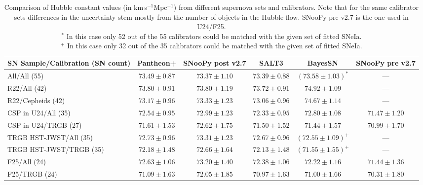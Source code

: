 \begin{table}[h]
\begin{center}
\centering
\begin{tabular}{l c c c c c}
\hline
SN Sample/Calibration  (SN count) & Pantheon+ & SNooPy post v2.7 & SALT3 & BayesSN & SNooPy pre v2.7 \\
\hline
All/All (55) & $73.49 \pm 0.87$ & $73.37 \pm 1.10$ & $73.39 \pm 0.88$ & $(73.58 \pm 1.03)^{*}$ & --- \\
R22/All (42) & $73.80 \pm 0.91$ & $73.80 \pm 1.19$ & $73.72 \pm 0.91$ & $74.92 \pm 1.09$ & --- \\
R22/Cepheids (42) & $73.17 \pm 0.96$ & $73.33 \pm 1.23$ & $73.06 \pm 0.96$ & $74.67 \pm 1.14$ & --- \\
CSP in U24/All (35) & $72.54 \pm 0.95$ & $72.99 \pm 1.23$ & $72.33 \pm 0.95$ & $72.80 \pm 1.08$ & $71.47 \pm 1.20$ \\
CSP in U24/TRGB (27) & $71.61 \pm 1.53$ & $72.62 \pm 1.75$ & $71.50 \pm 1.52$ & $71.44 \pm 1.57$ & $70.99 \pm 1.70$ \\
TRGB HST-JWST/All (35) & $72.73 \pm 0.96$ & $73.31 \pm 1.23$ & $72.67 \pm 0.96$ & $(72.55 \pm 1.09)^{+}$ & --- \\
TRGB HST-JWST/TRGB (35) & $72.18 \pm 1.48$ & $72.66 \pm 1.64$ & $72.13 \pm 1.48$ & $(71.55 \pm 1.55)^{+}$ & --- \\
F25/All (24) & $72.63 \pm 1.06$ & $73.20 \pm 1.40$ & $72.38 \pm 1.06$ & $72.22 \pm 1.16$ & $71.44\pm 1.36$ \\
F25/TRGB (24) & $71.09 \pm 1.63$ & $72.05 \pm 1.85$ & $70.97 \pm 1.63$ & $71.00 \pm 1.66 $& $70.31 \pm 1.80$ \\
\hline
\end{tabular}
\caption{\label{tab:literature_sn1a}Comparison of Hubble constant values (in km\,s$^{-1}$Mpc$^{-1}$) from different supernova sets and calibrators. Note that for the same calibrator sets differences in the uncertainty stem mostly from the number of objects in the Hubble flow. SNooPy pre v2.7 is the one used in U24/F25. \\ {\footnotesize${}^{*}$ In this case only 52 out of the 55 calibrators could be matched with the given set of fitted SNeIa.}\\{\footnotesize${}^{+}$ In this case only 32 out of the 35 calibrators could be matched with the given set of fitted SNeIa.}}
\end{center}
\end{table}

